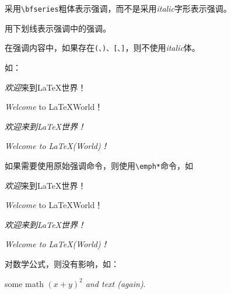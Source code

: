 \documentclass{ctexart}
\begin{document}
采用\verb|\bfseries|粗体表示强调，而不是采用\emph*{italic}字形表示强调。


用下划线表示强调中的强调。

在强调内容中，如果存在\verb|(、)、[、]|，则不使用\emph*{italic}体。

如：

\emph{欢迎}来到\LaTeX 世界！

\emph{Welcome} to \LaTeX World！

\emph{\emph{欢迎}来到\LaTeX 世界！}

\emph{\emph{Welcome} to \LaTeX (World)！}

如果需要使用原始强调命令，则使用\verb|\emph*|命令，如

\emph*{欢迎}来到\LaTeX 世界！

\emph*{Welcome} to \LaTeX World！

\emph*{\emph*{欢迎}来到\LaTeX 世界！}

\emph*{\emph*{Welcome} to \LaTeX (World)！}

对数学公式，则没有影响，如：

some math \emph{\((x+y)^2\) and text (again)}.
\end{document}
